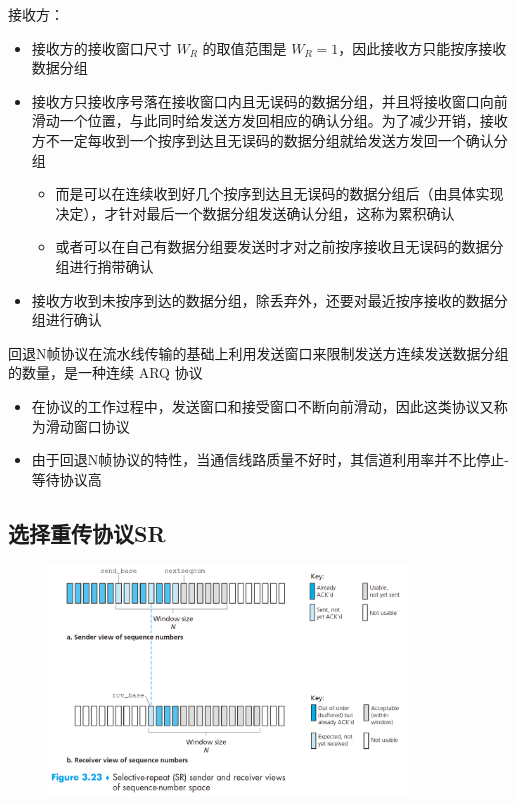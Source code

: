 \documentclass[cs4size,a4paper,10pt]{ctexart}
\begin{document}
	接收方：
	\begin{itemize}
		\item 接收方的接收窗口尺寸 $W_R$ 的取值范围是 $W_R=1$​​，因此接收方只能按序接收数据分组
		\item 接收方只接收序号落在接收窗口内且无误码的数据分组，并且将接收窗口向前滑动一个位置，与此同时给发送方发回相应的确认分组。为了减少开销，接收方不一定每收到一个按序到达且无误码的数据分组就给发送方发回一个确认分组
		\begin{itemize}
			\item 而是可以在连续收到好几个按序到达且无误码的数据分组后（由具体实现决定），才针对最后一个数据分组发送确认分组，这称为累积确认
			\item 或者可以在自己有数据分组要发送时才对之前按序接收且无误码的数据分组进行捎带确认
		\end{itemize}
		\item 接收方收到未按序到达的数据分组，除丢弃外，还要对最近按序接收的数据分组进行确认
	\end{itemize}

	回退N帧协议在流水线传输的基础上利用发送窗口来限制发送方连续发送数据分组的数量，是一种连续 ARQ 协议
	\begin{itemize}
		\item 在协议的工作过程中，发送窗口和接受窗口不断向前滑动，因此这类协议又称为滑动窗口协议
		\item 由于回退N帧协议的特性，当通信线路质量不好时，其信道利用率并不比停止-等待协议高
	\end{itemize}

	\subsection{选择重传协议SR}
	\begin{figure}[H]
		\centering
		\includegraphics[width=0.85\textwidth]{img/3.2.4.1}
	\end{figure}
\end{document}
